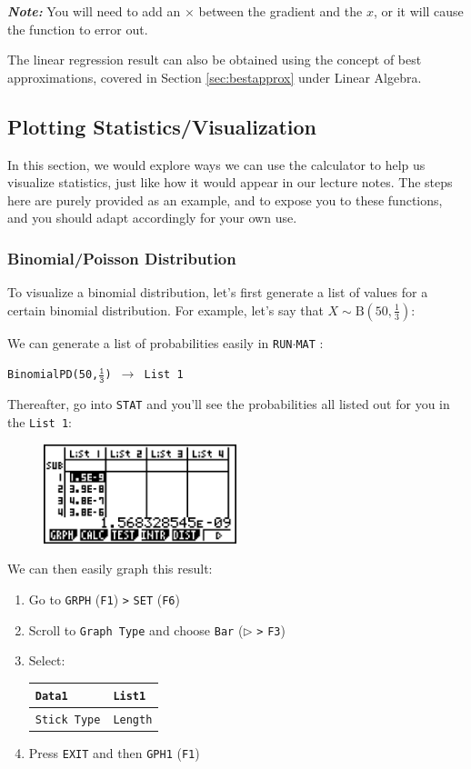 \documentclass[a5paper]{memoir}
\def\code#1{\texttt{#1}}
\def\note#1{\textcolor[HTML]{109fa9}{\textbf{\textit{Note:}}} #1}
\def\runmat{\code{RUN$\cdot$MAT} }
\def\Fone{(\code{F1}) }
\def\fone{(\code{F1})}
\def\fsix{(\code{F6})}
\begin{document}
\note{You will need to add an $\times$ between the gradient and the $x$, or it will cause the function to error out.}

The linear regression result can also be obtained using the concept of best approximations, covered in Section \ref{sec:bestapprox} under Linear Algebra.

\subsection{Plotting Statistics/Visualization} \label{sec:plotstat}
In this section, we would explore ways we can use the calculator to help us visualize statistics, just like how it would appear in our lecture notes. The steps here are purely provided as an example, and to expose you to these functions, and you should adapt accordingly for your own use.

\subsubsection{Binomial/Poisson Distribution}
To visualize a binomial distribution, let's first generate a list of values for a certain binomial distribution. For example, let's say that $X \sim \text{B}(50, \frac{1}{3})$:

We can generate a list of probabilities easily in \runmat:

\begin{center}
	\code{BinomialPD(50,$\mathtt{\frac{1}{3}}$) $\mathtt{\rightarrow}$ List 1}
\end{center}

Thereafter, go into \code{STAT} and you'll see the probabilities all listed out for you in the \code{List 1}:

\begin{figure}[h]
	\centering
	\includegraphics[width=0.5\textwidth]{binom50}
\end{figure}

We can then easily graph this result:
\begin{enumerate}
	\item Go to \code{GRPH} \Fone \code{>} \code{SET} \fsix
	\item Scroll to \code{Graph Type} and choose \code{Bar} ($\triangleright$ \code{>} \code{F3})
	\item Select:
	\begin{tabular}{| l | l |}
		\hline
		\code{Data1} 		& \code{List1} \\
		\hline
		\code{Stick Type} 	& \code{Length} \\
		\hline
	\end{tabular}
	\item Press \code{EXIT} and then \code{GPH1} \fone
\end{enumerate}
\end{document}
